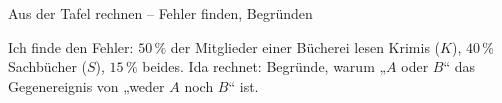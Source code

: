 \begin{aufgabe}{Aus der Tafel rechnen – Fehler finden, Begründen}
\begin{teile}
\teil Ich finde den Fehler: $50\,\%$ der Mitglieder einer Bücherei lesen Krimis ($K$), $40\,\%$ Sachbücher ($S$), $15\,\%$ beides. Ida rechnet: 
\teil Begründe, warum „$A$ oder $B$“ das Gegenereignis von „weder $A$ noch $B$“ ist.
\end{teile}
\end{aufgabe}
